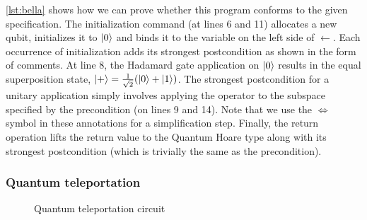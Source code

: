 \cref{lst:bella} shows how we can prove whether this program conforms to the given specification. The initialization command (at lines 6 and 11) allocates a new qubit, initializes it to $\ket{0}$ and binds it to the variable on the left side of $\leftarrow$. Each occurrence of initialization adds its strongest postcondition as shown in the form of comments. At line 8, the Hadamard gate application on $\ket{0}$ results in the equal superposition state, $\ket{+} = \frac{1}{\sqrt{2}}(\ket{0}+\ket{1})$. The strongest postcondition for a unitary application simply involves applying the operator to the subspace specified by the precondition (on lines 9 and 14). Note that we use the $\Leftrightarrow$ symbol in these annotations for a simplification step. Finally, the return operation lifts the return value to the Quantum Hoare type along with its strongest postcondition (which is trivially the same as the precondition).

\subsubsection{Quantum teleportation}
\label{sec:teleport}

\begin{figure}
    \centering
    \caption{Quantum teleportation circuit}
    \label{fig:teleport}
\end{figure}



